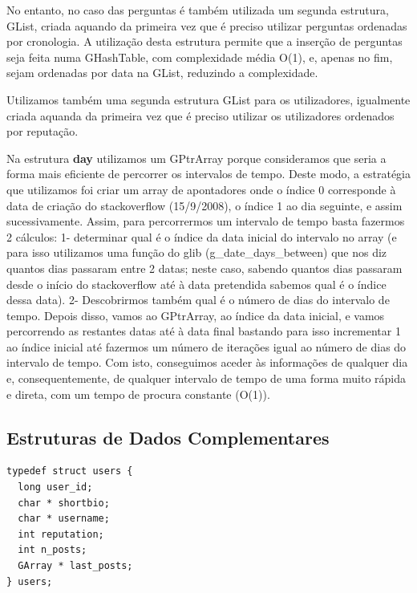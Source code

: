 \documentclass[a4paper]{article}
\begin{document}
No entanto, no caso das perguntas é também utilizada um segunda estrutura,
GList, criada aquando da primeira vez que é preciso utilizar perguntas
ordenadas por cronologia. A utilização desta estrutura permite que a inserção
de perguntas seja feita numa GHashTable, com complexidade média O(1),
e, apenas no fim, sejam ordenadas por data na GList, reduzindo a complexidade.\par

Utilizamos também uma segunda estrutura GList para os utilizadores, igualmente
criada aquanda da primeira vez que é preciso utilizar os utilizadores ordenados por
reputação.\par

Na estrutura \textbf{day} utilizamos um GPtrArray porque consideramos que seria
a forma mais eficiente de percorrer os intervalos de tempo. Deste modo,
a estratégia que utilizamos foi criar um array de apontadores onde o
índice 0 corresponde à data de criação do stackoverflow (15/9/2008),
o índice 1 ao dia seguinte, e assim sucessivamente. Assim, para percorrermos
um intervalo de tempo basta fazermos 2 cálculos: 1- determinar qual é o
índice da data inicial do intervalo no array (e para isso utilizamos uma função do glib
(g\_date\_days\_between) que nos diz quantos dias passaram entre 2 datas;
neste caso, sabendo quantos dias passaram desde o início do stackoverflow
até à data pretendida
sabemos qual é o índice dessa data). 2- Descobrirmos também qual é o número de
dias do intervalo de tempo. Depois disso, vamos ao GPtrArray, ao índice da
data inicial, e vamos percorrendo as restantes datas até à data final
bastando para isso incrementar 1 ao índice inicial até fazermos
um número de iterações igual ao número de dias do intervalo de tempo.
Com isto, conseguimos aceder às informações de qualquer dia e, consequentemente,
de qualquer intervalo de tempo de uma forma muito rápida e direta,
com um tempo de procura constante (O(1)). \par


\subsection{Estruturas de Dados Complementares}
\label{sec:dados_complementares}

\begin{verbatim}
typedef struct users {
  long user_id;
  char * shortbio;
  char * username;
  int reputation;
  int n_posts;
  GArray * last_posts;
} users;
\end{verbatim}
\end{document}
